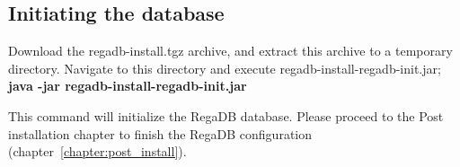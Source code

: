 \subsection{Initiating the database}
Download the regadb-install.tgz archive, and extract this archive to a temporary directory. 
Navigate to this directory and execute regadb-install-regadb-init.jar;
\\\textbf{java -jar regadb-install-regadb-init.jar}

This command will initialize the RegaDB database. Please proceed to the Post installation chapter to finish the RegaDB configuration (chapter~\ref{chapter:post_install}).
